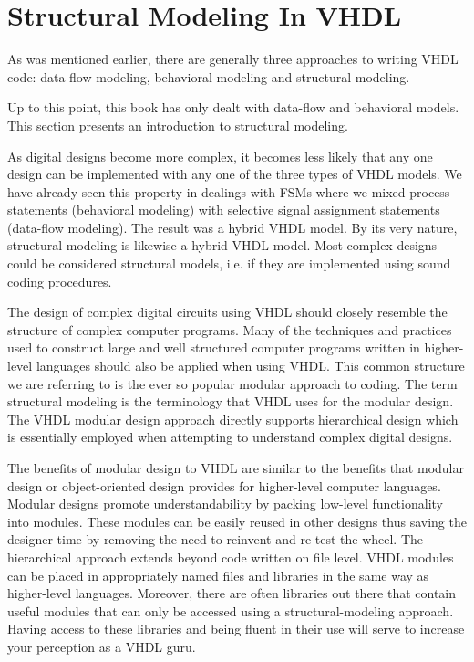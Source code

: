%
%
%
\chapter{Structural Modeling In VHDL}
As was mentioned earlier, there are generally three approaches to writing VHDL code: data-flow modeling, behavioral modeling and structural modeling.

Up to this point, this book has only dealt with data-flow and behavioral models. This section presents an introduction to structural modeling. 

As digital designs become more complex, it becomes less likely that any one design can be implemented with any one of the three types of VHDL models. We have already seen this property in dealings with FSMs where we mixed process statements (behavioral modeling) with selective signal assignment statements (data-flow modeling). The result was a hybrid VHDL model. By its very nature, structural modeling is likewise a hybrid VHDL model. Most complex designs could be considered structural models, i.e. if they are implemented using sound coding procedures. 

The design of complex digital circuits using VHDL should closely resemble the structure of complex computer programs. Many of the techniques and practices used to construct large and well structured computer programs written in higher-level languages should also be applied when using VHDL. This common structure we are referring to is the ever so popular modular approach to coding. The term structural modeling is the terminology that VHDL uses for the modular design. The VHDL modular design approach directly supports hierarchical design which is essentially employed when attempting to understand complex digital designs. 

The benefits of modular design to VHDL are similar to the benefits that modular design or object-oriented design provides for higher-level computer languages. Modular designs promote understandability by packing low-level functionality into modules. These modules can be easily reused in other designs thus saving the designer time by removing the need to reinvent and re-test the wheel. The hierarchical approach extends beyond code written on file level. VHDL modules can be placed in appropriately named files and libraries in the same way as higher-level languages. Moreover, there are often libraries out there that contain useful modules that can only be accessed using a structural-modeling approach. Having access to these libraries and being fluent in their use will serve to increase your perception as a VHDL guru.

